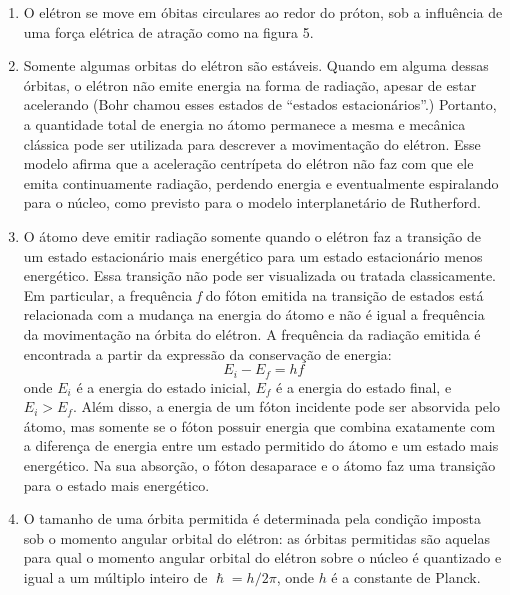 \documentclass[12pt, letterpaper]{article}
\begin{document}
    \begin{enumerate}
        \item O elétron se move em óbitas circulares ao redor do próton, sob a influência de uma força elétrica de atração como na figura 5.
        \item Somente algumas orbitas do elétron são estáveis. Quando em alguma dessas órbitas, o elétron não emite energia na forma de radiação, apesar de estar acelerando (Bohr chamou esses estados de ``estados estacionários''.) Portanto, a quantidade total de energia no átomo permanece a mesma e mecânica clássica pode ser utilizada para descrever a movimentação do elétron. Esse modelo afirma que a aceleração centrípeta do elétron não faz com que ele emita continuamente radiação, perdendo energia e eventualmente espiralando para o núcleo, como previsto para o modelo interplanetário de Rutherford.
        \item O átomo deve emitir radiação somente quando o elétron faz a transição de um estado estacionário mais energético para um estado estacionário menos energético. Essa transição não pode ser visualizada ou tratada classicamente. Em particular, a frequência \textit{f} do fóton emitida na transição de estados está relacionada com a mudança na energia do átomo e não é igual a frequência da movimentação na órbita do elétron. A frequência da radiação emitida é encontrada a partir da expressão da conservação de energia:
        \begin{equation} \label{eq9}
            E_i - E_f = hf
        \end{equation}
        onde $E_i$ é a energia do estado inicial, $E_f$ é a energia do estado final, e $E_i > E_f$. Além disso, a energia de um fóton incidente pode ser absorvida pelo átomo, mas somente se o fóton possuir energia que combina exatamente com a diferença de energia entre um estado permitido do átomo e um estado mais energético. Na sua absorção, o fóton desaparace e o átomo faz uma transição para o estado mais energético.
        \item O tamanho de uma órbita permitida  é determinada pela condição imposta sob o momento angular orbital do elétron: as órbitas permitidas são aquelas para qual o momento angular orbital do elétron sobre o núcleo é quantizado e igual a um múltiplo inteiro de $\hslash = h/2\pi$, onde $h$ é a constante de Planck.

    \end{enumerate}
\end{document}
